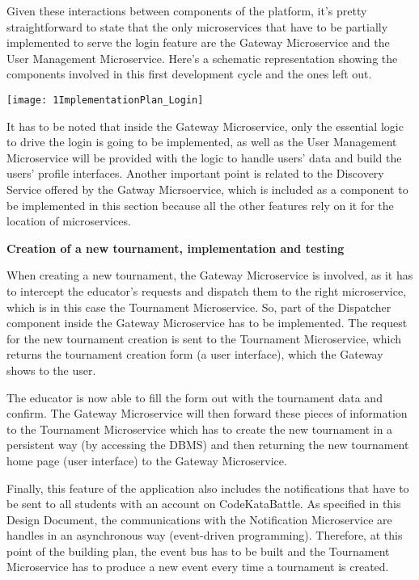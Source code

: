 Given these interactions between components of the \app platform, it's pretty straightforward to state that the only microservices that have to be partially implemented to serve the login feature are the Gateway Microservice and the User Management Microservice. 
Here's a schematic representation showing the components involved in this first development cycle and the ones left out.

\begin{center}
	\texttt{[image: 1ImplementationPlan\_Login]}
\end{center}


It has to be noted that inside the Gateway Microservice, only the essential logic to drive the login is going to be implemented, as well as the User Management Microservice will be provided with the logic to handle users' data and build the users' profile interfaces.
Another important point is related to the Discovery Service offered by the Gatway Micrsoervice, which is included as a component to be implemented in this section because all the other features rely on it for the location of microservices.


\vspace{0.7cm}

\textbf{Creation of a new tournament, implementation and testing}

When creating a new tournament, the Gateway Microservice is involved, as it has to intercept the educator's requests and dispatch them to the right microservice, which is in this case the Tournament Microservice. So, part of the Dispatcher component inside the Gateway Microservice has to be implemented. 
The request for the new tournament creation is sent to the Tournament Microservice, which returns the tournament creation form (a user interface), which the Gateway shows to the user.

The educator is now able to fill the form out with the tournament data and confirm. The Gateway Microservice will then forward these pieces of information to the Tournament Microservice which has to create the new tournament in a persistent way (by accessing the DBMS) and then returning the new tournament home page (user interface) to the Gateway Microservice.

Finally, this feature of the application also includes the notifications that have to be sent to all students with an account on CodeKataBattle. As specified in this Design Document, the communications with the Notification Microservice  are handles in an asynchronous way (event-driven programming). Therefore, at this point of the building plan, the event bus has to be built and the Tournament Microservice has to produce a new event every time a tournament is created. 

